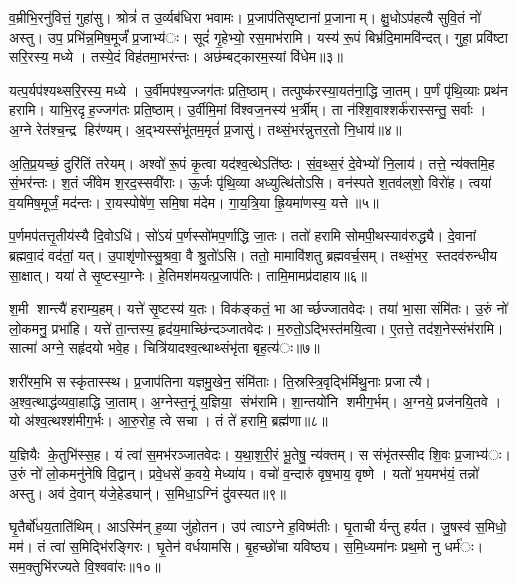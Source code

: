 व॒म्रीभि॒रनु॑वित्तं॒ गुहा॑सु। श्रोत्रं॑ त उ॒र्व्यब॑धिरा भवामः। प्र॒जाप॑तिसृष्टानां प्र॒जानाम्। क्षु॒धोऽप॑हत्यै सुवि॒तं नो॑ अस्तु। उप॒ प्रभि॑न्न॒मिष॒मूर्जं॑ प्र॒जाभ्य॑ः। सूदं॑ गृ॒हेभ्यो॒ रस॒माभ॑रामि। यस्य॑ रू॒पं बिभ्र॑दि॒मामवि॑न्दत्। गुहा॒ प्रवि॑ष्टा सरि॒रस्य॒ मध्ये। तस्ये॒दं विह॑तमा॒भर॑न्तः। अछ॑म्बट्कारम॒स्यां वि॑धेम॥३॥

यत्प॒र्यप॑श्यथ्सरि॒रस्य॒ मध्ये। उ॒र्वीमप॑श्य॒ज्जग॑तः प्रति॒ष्ठाम्। तत्पुष्क॑रस्या॒यत॑ना॒द्धि जा॒तम्। प॒र्णं पृ॑थि॒व्याः प्रथ॑न हरामि। याभि॒रदृह॒ज्जग॑तः प्रति॒ष्ठाम्। उ॒र्वीमि॒मां वि॑श्वज॒नस्य॑ भ॒र्त्रीम्। ता न॑श्शि॒वाश्शर्क॑रास्सन्तु॒ सर्वाः। अ॒ग्ने रेत॑श्च॒न्द्र हिर॑ण्यम्। अ॒द्भ्यस्संभू॑तम॒मृतं॑ प्र॒जासु॑। तथ्सं॒भर॑न्नुत्तर॒तो नि॒धाय॑॥४॥

अ॒ति॒प्र॒यच्छं॒ दुरि॑तिं तरेयम्। अश्वो॑ रू॒पं कृ॒त्वा यद॑श्व॒त्थेऽति॑ष्ठः। सं॒व॒थ्स॒रं दे॒वेभ्यो॑ नि॒लाय॑। तत्ते॒ न्य॑क्तमि॒ह सं॒भर॑न्तः। श॒तं जी॑वेम श॒रद॒स्सवी॑राः। ऊ॒र्जः पृ॑थि॒व्या अध्युत्थि॑तोऽसि। वन॑स्पते श॒तव॑ल्‌शो॒ विरो॑ह। त्वया॑ व॒यमिष॒मूर्जं॒ मद॑न्तः। रा॒यस्पोषे॑ण॒ समि॒षा म॑देम। गा॒य॒त्रि॒या ह्रि॒यमा॑णस्य॒ यत्ते॥५॥

प॒र्णमप॑तत्तृ॒तीय॑स्यै दि॒वोऽधि॑। सो॑ऽयं प॒र्णस्सो॑मप॒र्णाद्धि जा॒तः। ततो॑ हरामि सोमपी॒थस्याव॑रुद्ध्यै। दे॒वानां ब्रह्मवा॒दं वद॑तां॒ यत्। उ॒पाशृ॑णोस्सु॒श्रवा॒ वै श्रु॒तो॑ऽसि। ततो॒ मामावि॑शतु ब्रह्मवर्च॒सम्। तथ्सं॒भर॒ स्तदव॑रुन्धीय सा॒क्षात्। यया॑ ते सृ॒ष्टस्या॒ग्नेः। हे॒तिमश॑मयत्प्र॒जाप॑तिः। तामि॒मामप्र॑दाहाय॥६॥

श॒मी शान्त्यै॑ हराम्य॒हम्। यत्ते॑ सृ॒ष्टस्य॑ य॒तः। विक॑ङ्कतं॒ भा आर्च्छज्जातवेदः। तया॑ भा॒सा संमि॑तः। उ॒रुं नो॑ लो॒कमनु॒ प्रभा॑हि। यत्ते॑ ता॒न्तस्य॒ हृद॑य॒माच्छि॑न्दञ्जातवेदः। म॒रुतो॒ऽद्भिस्त॑मयि॒त्वा। ए॒तत्ते॒ तद॑श॒नेस्संभ॑रामि। सात्मा॑ अग्ने॒ सहृ॑दयो भवे॒ह। चित्रि॑यादश्व॒त्थाथ्संभृ॑ता बृह॒त्य॑ः॥७॥

शरी॑रम॒भि सस्कृ॑तास्स्थ। प्र॒जाप॑तिना यज्ञमु॒खेन॒ संमि॑ताः। ति॒स्रस्त्रि॒वृद्भि॑र्मिथु॒नाः प्रजात्यै। अ॒श्व॒त्थाद्ध॑व्यवा॒हाद्धि जा॒ताम्। अ॒ग्नेस्त॒नूं य॒ज्ञिया॒ संभ॑रामि। शा॒न्तयो॑नि शमीग॒र्भम्। अ॒ग्नये॒ प्रज॑नयि॒तवे। यो अ॑श्व॒त्थश्श॑मीग॒र्भः। आ॒रु॒रोह॒ त्वे सचा। तं ते॑ हरामि॒ ब्रह्म॑णा॥८॥

य॒ज्ञियैः के॒तुभि॑स्स॒ह। यं त्वा॑ स॒मभ॑रञ्जातवेदः। य॒था॒श॒री॒रं भू॒तेषु॒ न्य॑क्तम्। स संभृ॑तस्सीद शि॒वः प्र॒जाभ्य॑ः। उ॒रुं नो॑ लो॒कमनु॑नेषि वि॒द्वान्। प्रवे॒धसे॑ क॒वये॒ मेध्या॑य। वचो॑ व॒न्दारु॑ वृष॒भाय॒ वृष्णे। यतो॑ भ॒यमभ॑यं॒ तन्नो॑ अस्तु। अव॑ दे॒वान् य॑जे॒हेड्यान्॑। स॒मिधा॒ऽग्निं दु॑वस्यत॥९॥

घृ॒तैर्बो॑धय॒ताति॑थिम्। आऽस्मि॑न् ह॒व्या जु॑होतन। उप॑ त्वाऽग्ने ह॒विष्म॑तीः। घृ॒ताचीर्यन्तु हर्यत। जु॒षस्व॑ स॒मिधो॒ मम॑। तं त्वा॑ स॒मिद्भि॑रङ्गिरः। घृ॒तेन॑ वर्धयामसि। बृ॒हच्छो॑चा यविष्ठ्य। स॒मि॒ध्यमा॑नः प्रथ॒मो नु धर्म॑ः। सम॒क्तुभि॑रज्यते वि॒श्ववा॑रः॥१०॥

